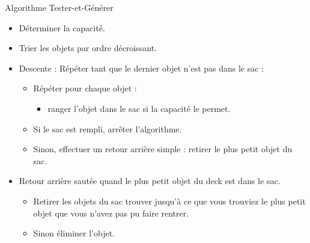 \documentclass[11pt,a4paper]{article}
\begin{document}
  \begin{algorithme}{Algorithme Tester-et-Générer}
    \begin{itemize}
    \item Déterminer la capacité.
    \item Trier les objets par ordre décroissant.
    \item  Descente : Répéter tant que le dernier objet n'est pas dans le sac :
      \begin{itemize}
      \item Répéter pour chaque objet :
        \begin{itemize}
        \item ranger l'objet dans le sac si la capacité le permet.
        \end{itemize}
      \item Si le sac est rempli, arrêter l'algorithme.
      \item Sinon, effectuer un retour arrière simple : retirer le plus petit objet du sac.
        \end{itemize}
      \item Retour arrière sautée quand le plus petit objet du deck est dans le sac.
      \begin{itemize}
      \item Retirer les objets du sac trouver jusqu'à ce que vous trouviez le plus petit objet que vous n'avez pas pu faire rentrer.
      \item Sinon éliminer l'objet.
      \end{itemize}
    \end{itemize}
  \end{algorithme}
\end{document}

